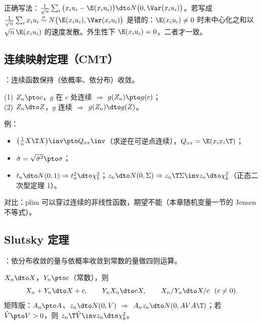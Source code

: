 \begin{note}[不要漏掉中心化]
正确写法：$\frac1{\sqrt n}\sum_i\big(x_iu_i-\E(x_iu_i)\big)\dto N\big(0,\Var(x_iu_i)\big)$。若写成 $\frac1{\sqrt n}\sum_ix_iu_i\overset{a}{\sim}N\big(\E(x_iu_i),\Var(x_iu_i)\big)$ 是错的：$\E(x_iu_i)\ne0$ 时未中心化之和以 $\sqrt n\,\E(x_iu_i)$ 的速度发散。外生性下 $\E(x_iu_i)=0$，二者才一致。
\end{note}

\subsection{连续映射定理（CMT）}

：连续函数保持（依概率、依分布）收敛。

\begin{thm}\label{thm:U01b-cmt}
(1) $Z_n\pto c$，$g$ 在 $c$ 处连续 $\Rightarrow$ $g(Z_n)\pto g(c)$；\\
(2) $Z_n\dto Z$，$g$ 连续 $\Rightarrow$ $g(Z_n)\dto g(Z)$。
\end{thm}

例：
\begin{itemize}
  \item $\big(\frac1nX\T X\big)\inv\pto Q_{xx}\inv$（求逆在可逆点连续），$Q_{xx}=\E(x_ix_i\T)$；
  \item $\hat\sigma=\sqrt{\hat\sigma^2}\pto\sigma$；
  \item $t_n\dto N(0,1)\Rightarrow t_n^2\dto\chi^2_1$；$z_n\dto N(0,\Sigma)\Rightarrow z_n\T\Sigma\inv z_n\dto\chi^2_k$（正态二次型定理 1）。
\end{itemize}
对比：plim 可以穿过连续的非线性函数，期望不能（本章随机变量一节的 Jensen 不等式）。

\subsection{Slutsky 定理}

：依分布收敛的量与依概率收敛到常数的量做四则运算。

\begin{thm}[Slutsky 定理]\label{thm:U01b-slutsky}
$X_n\dto X$，$Y_n\pto c$（常数），则
\[
X_n+Y_n\dto X+c,\qquad Y_nX_n\dto cX,\qquad X_n/Y_n\dto X/c\ \ (c\ne0).
\]
矩阵版：$A_n\pto A$、$z_n\dto N(0,V)$ $\Rightarrow$ $A_nz_n\dto N(0,AVA\T)$；若 $\hat V\pto V>0$，则 $z_n\T\hat V\inv z_n\dto\chi^2_k$。
\end{thm}

